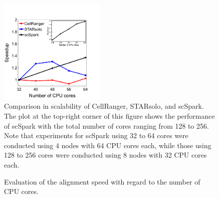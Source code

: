 \documentclass[conference]{IEEEtran}
\begin{document}
\begin{figure}
	\centering
	\includegraphics[width=0.45\textwidth]{fig3.pdf}
	\caption{Comparison in scalability of CellRanger, STARsolo, and scSpark. The plot at the top-right corner of this figure shows the performance of scSpark with the total number of cores ranging from 128 to 256. Note that experiments for scSpark using 32 to 64 cores were conducted using 4 nodes with 64 CPU cores each, while those using 128 to 256 cores were conducted using 8 nodes with 32 CPU cores each.}
	\label{fig3}
\end{figure}
\begin{figure}
	\centering
	\caption{Evaluation of the alignment speed with regard to the number of CPU cores.}
	\label{fig4}
\end{figure}
\end{document}
